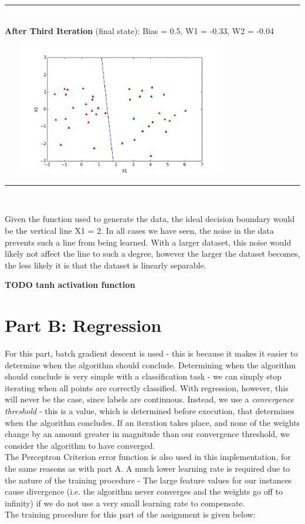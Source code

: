 \documentclass{article}
\begin{document}
\begin{center}
\vspace{2mm}
\rule{8cm}{0.4pt} \\
\vspace{2mm}
\textbf{After Third Iteration} (final state): Bias = 0.5, W1 = -0.33, W2 = -0.04 \\
\centerline{\includegraphics[width=400px, height=220px]{partA2_iter3}}
\vspace{2mm}
\rule{8cm}{0.4pt} \\
\vspace{2mm}
\end{center}

\noindent Given the function used to generate the data, the ideal decision boundary would be the vertical line X1 = 2. In all cases we have seen, the noise in the data prevents such a line from being learned. With a larger dataset, this noise would likely not affect the line to such a degree, however the larger the dataset becomes, the less likely it is that the dataset is linearly separable.

\textbf{TODO tanh activation function}
\section*{Part B: Regression}
For this part, batch gradient descent is used - this is because it makes it easier to determine when the algorithm should conclude. Determining when the algorithm should conclude is very simple with a classification task - we can simply stop iterating when all points are correctly classified. With regression, however, this will never be the case, since labels are continuous. Instead, we use a \emph{convergence threshold} - this is a value, which is determined before execution, that determines when the algorithm concludes. If an iteration takes place, and none of the weights change by an amount greater in magnitude than our convergence threshold, we consider the algorithm to have converged. \\
\indent The Perceptron Criterion error function is also used in this implementation, for the same reasons as with part A.
A much lower learning rate is required due to the nature of the training procedure - The large feature values for our instances cause divergence (i.e. the algorithm never converges and the weights go off to infinity) if we do not use a very small learning rate to compensate. \\
\indent The training procedure for this part of the assignment is given below:
\end{document}
